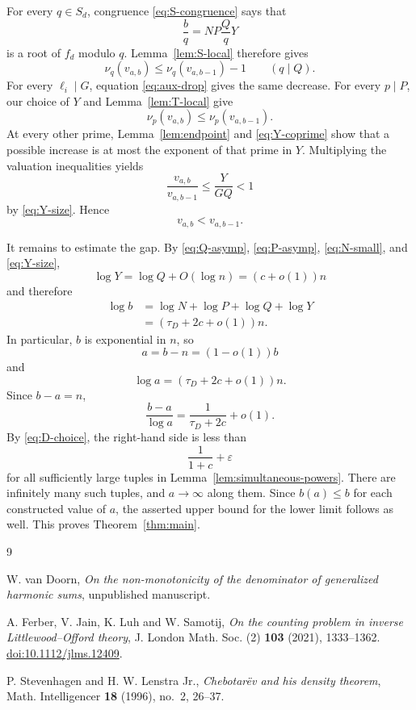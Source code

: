 \documentclass[11pt]{article}
\begin{document}
For every $q\in S_d$, congruence \eqref{eq:S-congruence} says that
\[
  \frac bq=NP\frac QqY
\]
is a root of $f_d$ modulo $q$. Lemma~\ref{lem:S-local} therefore gives
\begin{equation}\label{eq:Q-drop}
  \nu_q(v_{a,b})\leq\nu_q(v_{a,b-1})-1
  \qquad(q\mid Q).
\end{equation}
For every $\ell_i\mid G$, equation \eqref{eq:aux-drop} gives the same decrease. For every $p\mid P$, our choice of $Y$ and Lemma~\ref{lem:T-local} give
\begin{equation}\label{eq:P-neutral}
  \nu_p(v_{a,b})\leq\nu_p(v_{a,b-1}).
\end{equation}
At every other prime, Lemma~\ref{lem:endpoint} and \eqref{eq:Y-coprime} show that a possible increase is at most the exponent of that prime in $Y$. Multiplying the valuation inequalities yields
\begin{equation}\label{eq:ratio}
  \frac{v_{a,b}}{v_{a,b-1}}
  \leq\frac{Y}{GQ}<1
\end{equation}
by \eqref{eq:Y-size}. Hence
\[
  v_{a,b}<v_{a,b-1}.
\]

It remains to estimate the gap. By \eqref{eq:Q-asymp}, \eqref{eq:P-asymp}, \eqref{eq:N-small}, and \eqref{eq:Y-size},
\[
  \log Y=\log Q+O(\log n)=(c+o(1))n
\]
and therefore
\begin{equation}\label{eq:log-b}
\begin{aligned}
  \log b
  &=\log N+\log P+\log Q+\log Y\\
  &=(\tau_D+2c+o(1))n.
\end{aligned}
\end{equation}
In particular, $b$ is exponential in $n$, so
\[
  a=b-n=(1-o(1))b
\]
and
\[
  \log a=(\tau_D+2c+o(1))n.
\]
Since $b-a=n$,
\begin{equation}\label{eq:gap-limit}
  \frac{b-a}{\log a}
  =\frac1{\tau_D+2c}+o(1).
\end{equation}
By \eqref{eq:D-choice}, the right-hand side is less than
\[
  \frac1{1+c}+\varepsilon
\]
for all sufficiently large tuples in Lemma~\ref{lem:simultaneous-powers}. There are infinitely many such tuples, and $a\to\infty$ along them. Since $b(a)\leq b$ for each constructed value of $a$, the asserted upper bound for the lower limit follows as well. This proves Theorem~\ref{thm:main}.

\begin{thebibliography}{9}

W. van Doorn,
\emph{On the non-monotonicity of the denominator of generalized harmonic sums},
unpublished manuscript.

A. Ferber, V. Jain, K. Luh and W. Samotij,
\emph{On the counting problem in inverse Littlewood--Offord theory},
J. London Math. Soc. (2) \textbf{103} (2021), 1333--1362.
\href{https://doi.org/10.1112/jlms.12409}{doi:10.1112/jlms.12409}.

P. Stevenhagen and H. W. Lenstra Jr.,
\emph{Chebotar\"ev and his density theorem},
Math. Intelligencer \textbf{18} (1996), no.~2, 26--37.

\end{thebibliography}
\end{document}
